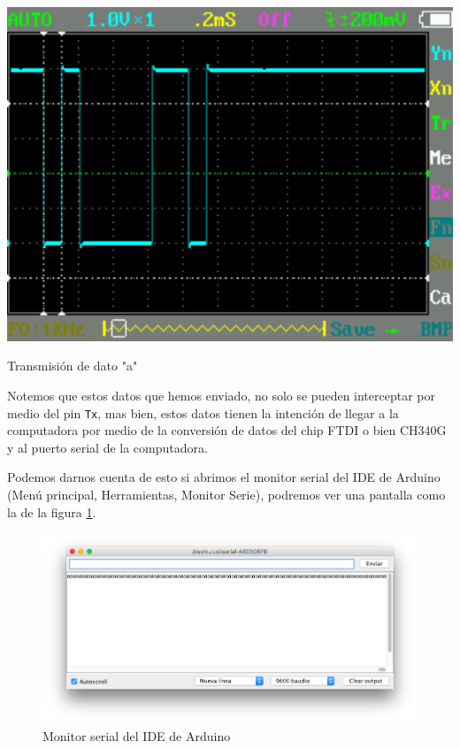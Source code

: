 		\begin{marginfigure}
			\begin{center}
				\includegraphics[width=\textwidth]{images/a10msz.pdf}
				\caption{Transmisión de dato "a"}
				\label{fig:trans4}
			\end{center}
		\end{marginfigure}

		Notemos que estos datos que hemos enviado, no solo se pueden interceptar por medio del pin \texttt{Tx}, mas bien, estos datos tienen la intención de llegar a la computadora por medio de la conversión de datos del chip FTDI o bien CH340G y al puerto serial de la computadora.

		Podemos darnos cuenta de esto si abrimos el monitor serial del IDE de Arduino (Menú principal, Herramientas, Monitor Serie), podremos ver una pantalla como la de la figura \ref{fig:mon-ser}.

		\begin{figure}
			\begin{center}
				\includegraphics[width=\textwidth]{images/monitor-serial.png}
				\caption{Monitor serial del IDE de Arduino}
				\label{fig:mon-ser}
			\end{center}
		\end{figure}

